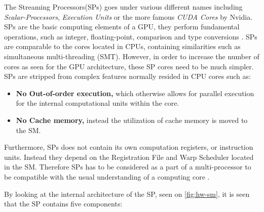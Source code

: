 The Streaming Processors(SPs) goes under various different names including \textit{Scalar-Processors}, \textit{Execution Units} or the more famous \textit{CUDA Cores} by Nvidia.
SPs are the basic computing elements of a GPU, they perform fundamental operations, such as integer, floating-point, comparison and type conversions \cite{Li2016}.
SPs are comparable to the cores located in CPUs, containing similarities such as simultaneous multi-threading (SMT).
However, in order to increase the number of cores as seen for the GPU architecture, these SP cores need to be much simpler.
SPs are stripped from complex features normally resided in CPU cores such as:

\begin{itemize}
	\item \textbf{No Out-of-order execution,} which otherwise allows for parallel execution for the internal computational units within the core. 
	\item \textbf{No Cache memory,} instead the utilization of cache memory is moved to the SM. 
\end{itemize}

Furthermore, SPs does not contain its own computation registers, or instruction units.
Instead they depend on the Registration File and Warp Scheduler located in the SM.
Therefore SPs has to be considered as a part of a multi-processor to be compatible with the usual understanding of a computing core \cite{Maitre2013}.

By looking at the internal architecture of the SP, seen on \cref{fig:hw-sm}, it is seen that the SP contains five components:

